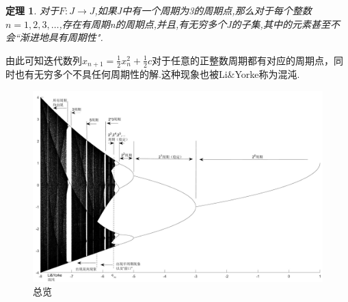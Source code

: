 \documentclass[a4paper]{article}%
\newtheorem{thm}{定理}
\begin{document}
\begin{thm}对于$F:J\to J$,如果J中有一个周期为3的周期点,那么对于每个整数$n=1,2,3,\ldots $,存在有周期n的周期点,并且,有无穷多个J的子集,其中的元素甚至不会“渐进地具有周期性".\cite{d}\end{thm}

由此可知迭代数列$x_{n+1}=\frac{1}{2}x_{n}^2+\frac{1}{2}c$对于任意的正整数周期都有对应的周期点，同时也有无穷多个不具任何周期性的解.这种现象也被Li\&Yorke称为混沌.\cite{d}
\begin{figure}[htb]
    \centering
    \includegraphics[scale=0.275]{图七}
    \caption[图七]{总览}\label{fig-图七}
    \end{figure}

\end{document}
